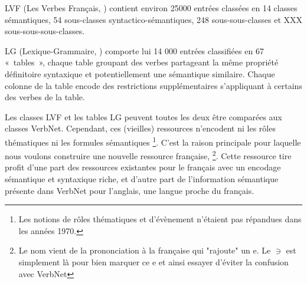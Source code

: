 LVF (Les Verbes Français, \cite{dubois1997verbes}) contient environ 25000
entrées classées en 14 classes sémantiques, 54 sous-classes
syntactico-sémantiques, 248 sous-sous-classes et XXX sous-sous-sous-classes.


LG (Lexique-Grammaire, \cite{gross1975methodes,boons1976structure}) comporte
lui 14 000 entrées classifiées en 67 «~tables~», chaque table groupant des
verbes partageant la même propriété définitoire syntaxique et potentiellement
une sémantique similaire. Chaque colonne de la table encode des restrictions
supplémentaires s'appliquant à certains des verbes de la table.



Les classes LVF et les tables LG peuvent toutes les deux être comparées aux
classes VerbNet. Cependant, ces (vieilles) ressources n'encodent ni les rôles
thématiques ni les formules sémantiques \footnote{Les notions de rôles
thématiques et d'évènement n'étaient pas répandues dans les années 1970.}.
C'est la raison principale pour laquelle nous voulons construire une nouvelle
ressource française, \verbenet{}\footnote{Le nom vient de la prononciation à la
    française qui "rajoute" un e. Le $\ni$ est simplement là pour bien marquer
ce e et ainsi essayer d'éviter la confusion avec VerbNet}. Cette ressource tire
profit d'une part des ressources existantes pour le français avec un encodage
sémantique et syntaxique riche, et d'autre part de l'information sémantique
présente dans VerbNet pour l'anglais, une langue proche du français.
